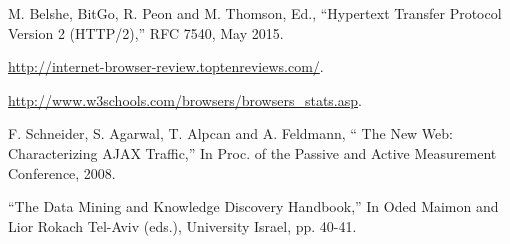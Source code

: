 \begin{thebibliography}{1}
M. Belshe, BitGo, R. Peon and M. Thomson, Ed., ``Hypertext Transfer Protocol Version 2 (HTTP/2),'' RFC 7540, May 2015.

\url{http://internet-browser-review.toptenreviews.com/}.

\url{http://www.w3schools.com/browsers/browsers_stats.asp}.

F. Schneider, S. Agarwal, T. Alpcan and A. Feldmann, `` The New Web: Characterizing AJAX Traffic,'' In Proc. of the Passive and Active Measurement Conference, 2008.

``The Data Mining and Knowledge Discovery Handbook,''
In Oded Maimon and Lior Rokach Tel-Aviv (eds.), University Israel, pp. 40-41.

\end{thebibliography}